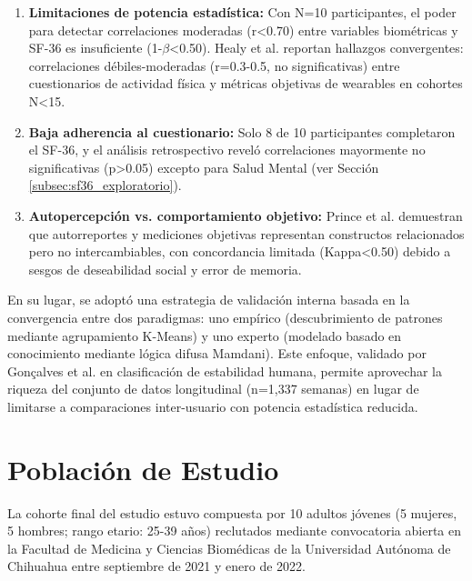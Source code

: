 \begin{enumerate}
    \item \textbf{Limitaciones de potencia estadística:} Con N=10 participantes, el poder para detectar correlaciones moderadas (r<0.70) entre variables biométricas y SF-36 es insuficiente (1-$\beta$<0.50). Healy et al. \cite{Healy2024} reportan hallazgos convergentes: correlaciones débiles-moderadas (r=0.3-0.5, no significativas) entre cuestionarios de actividad física y métricas objetivas de wearables en cohortes N<15.
    
    \item \textbf{Baja adherencia al cuestionario:} Solo 8 de 10 participantes completaron el SF-36, y el análisis retrospectivo reveló correlaciones mayormente no significativas (p>0.05) excepto para Salud Mental (ver Sección \ref{subsec:sf36_exploratorio}).
    
    \item \textbf{Autopercepción vs. comportamiento objetivo:} Prince et al. \cite{Prince2008} demuestran que autorreportes y mediciones objetivas representan constructos relacionados pero no intercambiables, con concordancia limitada (Kappa<0.50) debido a sesgos de deseabilidad social y error de memoria.
\end{enumerate}

En su lugar, se adoptó una estrategia de validación interna basada en la convergencia entre dos paradigmas: uno empírico (descubrimiento de patrones mediante agrupamiento K-Means) y uno experto (modelado basado en conocimiento mediante lógica difusa Mamdani). Este enfoque, validado por Gonçalves et al. \cite{Goncalves2021} en clasificación de estabilidad humana, permite aprovechar la riqueza del conjunto de datos longitudinal (n=1,337 semanas) en lugar de limitarse a comparaciones inter-usuario con potencia estadística reducida.

\section{Población de Estudio}
\label{sec:poblacion_estudio}

La cohorte final del estudio estuvo compuesta por 10 adultos jóvenes (5 mujeres, 5 hombres; rango etario: 25-39 años) reclutados mediante convocatoria abierta en la Facultad de Medicina y Ciencias Biomédicas de la Universidad Autónoma de Chihuahua entre septiembre de 2021 y enero de 2022.

